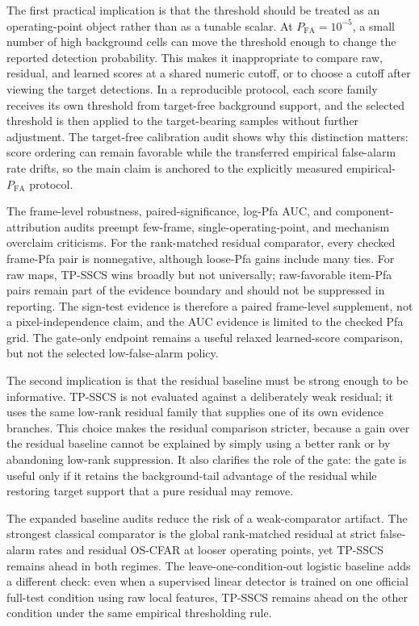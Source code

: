 \documentclass[journal]{IEEEtran}
\begin{document}
The first practical implication is that the threshold should be treated as an operating-point object rather than as a tunable scalar. At $P_{\mathrm{FA}}=10^{-5}$, a small number of high background cells can move the threshold enough to change the reported detection probability. This makes it inappropriate to compare raw, residual, and learned scores at a shared numeric cutoff, or to choose a cutoff after viewing the target detections. In a reproducible protocol, each score family receives its own threshold from target-free background support, and the selected threshold is then applied to the target-bearing samples without further adjustment. The target-free calibration audit shows why this distinction matters: score ordering can remain favorable while the transferred empirical false-alarm rate drifts, so the main claim is anchored to the explicitly measured empirical-$P_{\mathrm{FA}}$ protocol.

The frame-level robustness, paired-significance, log-Pfa AUC, and component-attribution audits preempt few-frame, single-operating-point, and mechanism overclaim criticisms. For the rank-matched residual comparator, every checked frame-Pfa pair is nonnegative, although loose-Pfa gains include many ties. For raw maps, TP-SSCS wins broadly but not universally; raw-favorable item-Pfa pairs remain part of the evidence boundary and should not be suppressed in reporting. The sign-test evidence is therefore a paired frame-level supplement, not a pixel-independence claim, and the AUC evidence is limited to the checked Pfa grid. The gate-only endpoint remains a useful relaxed learned-score comparison, but not the selected low-false-alarm policy.

The second implication is that the residual baseline must be strong enough to be informative. TP-SSCS is not evaluated against a deliberately weak residual; it uses the same low-rank residual family that supplies one of its own evidence branches. This choice makes the residual comparison stricter, because a gain over the residual baseline cannot be explained by simply using a better rank or by abandoning low-rank suppression. It also clarifies the role of the gate: the gate is useful only if it retains the background-tail advantage of the residual while restoring target support that a pure residual may remove.

The expanded baseline audits reduce the risk of a weak-comparator artifact. The strongest classical comparator is the global rank-matched residual at strict false-alarm rates and residual OS-CFAR at looser operating points, yet TP-SSCS remains ahead in both regimes. The leave-one-condition-out logistic baseline adds a different check: even when a supervised linear detector is trained on one official full-test condition using raw local features, TP-SSCS remains ahead on the other condition under the same empirical thresholding rule.
\end{document}
